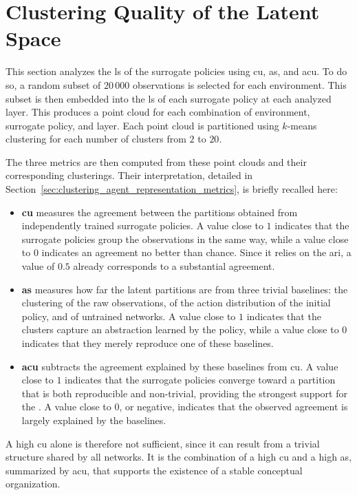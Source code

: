 \section{Clustering Quality of the Latent Space}
\label{sec:experiments_clustering_quality}

This section analyzes the \gls{ls} of the surrogate policies using \gls{cu}, \gls{as}, and \gls{acu}.
To do so, a random subset of $20\,000$ observations is selected for each environment.
This subset is then embedded into the \gls{ls} of each surrogate policy at each analyzed layer.
This produces a point cloud for each combination of environment, surrogate policy, and layer.
Each point cloud is partitioned using $k$-means clustering \parencite{macqueen1967multivariate} for each number of clusters from $2$ to $20$.

The three metrics are then computed from these point clouds and their corresponding clusterings.
Their interpretation, detailed in Section~\ref{sec:clustering_agent_representation_metrics}, is briefly recalled here:
\begin{itemize}
    \item \textbf{\gls{cu}} measures the agreement between the partitions obtained from independently trained surrogate policies.
    A value close to $1$ indicates that the surrogate policies group the observations in the same way, while a value close to $0$ indicates an agreement no better than chance.
    Since it relies on the \gls{ari}, a value of $0.5$ already corresponds to a substantial agreement.
    \item \textbf{\gls{as}} measures how far the latent partitions are from three trivial baselines: the clustering of the raw observations, of the action distribution of the initial policy, and of untrained networks.
    A value close to $1$ indicates that the clusters capture an abstraction learned by the policy, while a value close to $0$ indicates that they merely reproduce one of these baselines.
    \item \textbf{\gls{acu}} subtracts the agreement explained by these baselines from \gls{cu}.
    A value close to $1$ indicates that the surrogate policies converge toward a partition that is both reproducible and non-trivial, providing the strongest support for the \RepresentationConvergenceHypothesisName.
    A value close to $0$, or negative, indicates that the observed agreement is largely explained by the baselines.
\end{itemize}
A high \gls{cu} alone is therefore not sufficient, since it can result from a trivial structure shared by all networks.
It is the combination of a high \gls{cu} and a high \gls{as}, summarized by \gls{acu}, that supports the existence of a stable conceptual organization.

